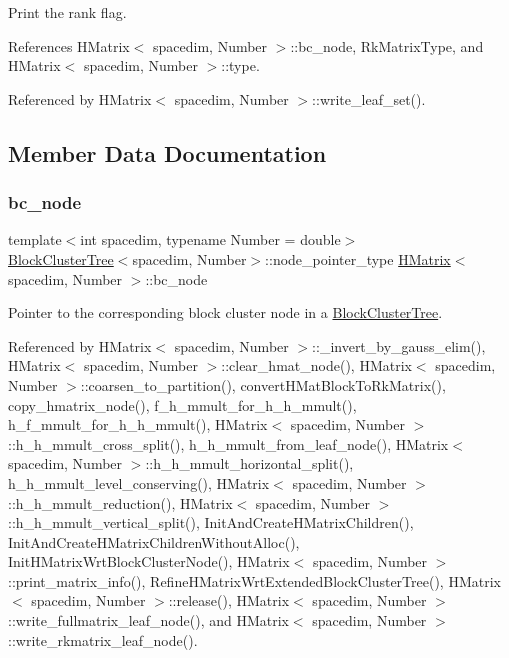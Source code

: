 Print the {\ttfamily rank} flag.

References H\+Matrix$<$ spacedim, Number $>$\+::bc\+\_\+node, Rk\+Matrix\+Type, and H\+Matrix$<$ spacedim, Number $>$\+::type.



Referenced by H\+Matrix$<$ spacedim, Number $>$\+::write\+\_\+leaf\+\_\+set().



\subsection{Member Data Documentation}
\mbox{\label{classHMatrix_a4a304494c970b5b267be1d8459d51586}} 
\subsubsection{\texorpdfstring{bc\+\_\+node}{bc\_node}}
{\footnotesize\ttfamily template$<$int spacedim, typename Number = double$>$ \\
\hyperlink{classBlockClusterTree}{Block\+Cluster\+Tree}$<$spacedim, Number$>$\+::node\+\_\+pointer\+\_\+type \hyperlink{classHMatrix}{H\+Matrix}$<$ spacedim, Number $>$\+::bc\+\_\+node\hspace{0.3cm}{\ttfamily [private]}}

Pointer to the corresponding block cluster node in a \hyperlink{classBlockClusterTree}{Block\+Cluster\+Tree}. 

Referenced by H\+Matrix$<$ spacedim, Number $>$\+::\+\_\+invert\+\_\+by\+\_\+gauss\+\_\+elim(), H\+Matrix$<$ spacedim, Number $>$\+::clear\+\_\+hmat\+\_\+node(), H\+Matrix$<$ spacedim, Number $>$\+::coarsen\+\_\+to\+\_\+partition(), convert\+H\+Mat\+Block\+To\+Rk\+Matrix(), copy\+\_\+hmatrix\+\_\+node(), f\+\_\+h\+\_\+mmult\+\_\+for\+\_\+h\+\_\+h\+\_\+mmult(), h\+\_\+f\+\_\+mmult\+\_\+for\+\_\+h\+\_\+h\+\_\+mmult(), H\+Matrix$<$ spacedim, Number $>$\+::h\+\_\+h\+\_\+mmult\+\_\+cross\+\_\+split(), h\+\_\+h\+\_\+mmult\+\_\+from\+\_\+leaf\+\_\+node(), H\+Matrix$<$ spacedim, Number $>$\+::h\+\_\+h\+\_\+mmult\+\_\+horizontal\+\_\+split(), h\+\_\+h\+\_\+mmult\+\_\+level\+\_\+conserving(), H\+Matrix$<$ spacedim, Number $>$\+::h\+\_\+h\+\_\+mmult\+\_\+reduction(), H\+Matrix$<$ spacedim, Number $>$\+::h\+\_\+h\+\_\+mmult\+\_\+vertical\+\_\+split(), Init\+And\+Create\+H\+Matrix\+Children(), Init\+And\+Create\+H\+Matrix\+Children\+Without\+Alloc(), Init\+H\+Matrix\+Wrt\+Block\+Cluster\+Node(), H\+Matrix$<$ spacedim, Number $>$\+::print\+\_\+matrix\+\_\+info(), Refine\+H\+Matrix\+Wrt\+Extended\+Block\+Cluster\+Tree(), H\+Matrix$<$ spacedim, Number $>$\+::release(), H\+Matrix$<$ spacedim, Number $>$\+::write\+\_\+fullmatrix\+\_\+leaf\+\_\+node(), and H\+Matrix$<$ spacedim, Number $>$\+::write\+\_\+rkmatrix\+\_\+leaf\+\_\+node().

